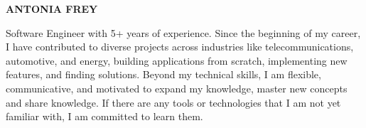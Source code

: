 \documentclass[10pt, a4paper]{article}
\begin{document}
\setlength{\topskip}{0pt}
\setlength{\parindent}{0pt}
\setlength{\parskip}{0pt}
\setlength{\fboxsep}{0pt}
\pagestyle{empty}
\raggedbottom
{}

\begin{minipage}[t]{0.33\textwidth} 
\colorbox{cvcolor}{\begin{minipage}[t][5mm][t]{\textwidth}\null\hfill\null\end{minipage}}

\vspace{-.2ex} 
\colorbox{cvcolor!90}{\color{white}  
\textwidth\relax
\begin{minipage}[t][293mm][t]{0.82\textwidth}
\raggedright
\vspace*{2.5ex}


\noindent
\null\hfill%
%
\hfill\null

\vspace*{1ex}
{\centering 
\LARGE \textbf{\MakeUppercase{Antonia Frey}}\\
}


\parbox{1\textwidth}{
{\small
\justifying
\noindent Software Engineer with 5+ years of experience. Since the beginning of my career, I have contributed to diverse projects across industries like telecommunications, automotive, and energy, building applications from scratch, implementing new features, and finding solutions. Beyond my technical skills, I am flexible, communicative, and motivated to expand my knowledge, master new concepts and share knowledge. If there are any tools or technologies that I am not yet familiar with, I am committed to learn them.
}}



\end{minipage}}
\end{minipage}
\end{document}
